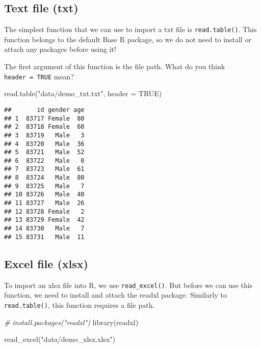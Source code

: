 \documentclass[
]{book}
\newenvironment{Shaded}{\begin{snugshade}}{\end{snugshade}}
\newcommand{\AttributeTok}[1]{\textcolor[rgb]{0.77,0.63,0.00}{#1}}
\newcommand{\CommentTok}[1]{\textcolor[rgb]{0.56,0.35,0.01}{\textit{#1}}}
\newcommand{\ConstantTok}[1]{\textcolor[rgb]{0.00,0.00,0.00}{#1}}
\newcommand{\FunctionTok}[1]{\textcolor[rgb]{0.00,0.00,0.00}{#1}}
\newcommand{\NormalTok}[1]{#1}
\newcommand{\StringTok}[1]{\textcolor[rgb]{0.31,0.60,0.02}{#1}}
\begin{document}
\hypertarget{text-file-txt}{%
\subsection{Text file (txt)}\label{text-file-txt}}

The simplest function that we can use to import a txt file is \texttt{read.table()}. This function belongs to the default Base R package, so we do not need to install or attach any packages before using it!

The first argument of this function is the file path. What do you think \texttt{header\ =\ TRUE} mean?

\begin{Shaded}
\begin{Highlighting}[]
\FunctionTok{read.table}\NormalTok{(}\StringTok{"data/demo\_txt.txt"}\NormalTok{, }\AttributeTok{header =} \ConstantTok{TRUE}\NormalTok{)}
\end{Highlighting}
\end{Shaded}

\begin{verbatim}
##       id gender age
## 1  83717 Female  80
## 2  83718 Female  60
## 3  83719   Male   3
## 4  83720   Male  36
## 5  83721   Male  52
## 6  83722   Male   0
## 7  83723   Male  61
## 8  83724   Male  80
## 9  83725   Male   7
## 10 83726   Male  40
## 11 83727   Male  26
## 12 83728 Female   2
## 13 83729 Female  42
## 14 83730   Male   7
## 15 83731   Male  11
\end{verbatim}

\hypertarget{excel-file-xlsx}{%
\subsection{Excel file (xlsx)}\label{excel-file-xlsx}}

To import an xlsx file into R, we use \texttt{read\_excel()}. But before we can use this function, we need to install and attach the readxl package. Similarly to \texttt{read.table()}, this function requires a file path.

\begin{Shaded}
\begin{Highlighting}[]
\CommentTok{\# install.packages("readxl")}
\FunctionTok{library}\NormalTok{(readxl)}

\FunctionTok{read\_excel}\NormalTok{(}\StringTok{"data/demo\_xlsx.xlsx"}\NormalTok{)}
\end{Highlighting}
\end{Shaded}
\end{document}
